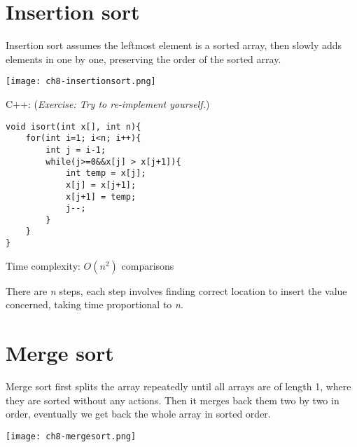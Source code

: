 \pagebreak

\section{Insertion sort}

Insertion sort assumes the leftmost element is a sorted array, then slowly adds elements in one by one, preserving the order of the sorted array.

\texttt{[image: ch8-insertionsort.png]}




C++: (\textit{Exercise: Try to re-implement yourself.})
\begin{lstlisting}
void isort(int x[], int n){
    for(int i=1; i<n; i++){
        int j = i-1;
        while(j>=0&&x[j] > x[j+1]){
            int temp = x[j];
            x[j] = x[j+1];
            x[j+1] = temp;
            j--;
        }
    }
}
\end{lstlisting}

Time complexity: $O(n^2)$ comparisons
\vspace{6mm}

There are \textit{n} steps, each step involves finding correct location to insert the value concerned, taking time proportional to \textit{n}.

\pagebreak

\section{Merge sort}

Merge sort first splits the array repeatedly until all arrays are of length 1, where they are sorted without any actions. Then it merges back them two by two in order, eventually we get back the whole array in sorted order.

\texttt{[image: ch8-mergesort.png]}

\pagebreak


